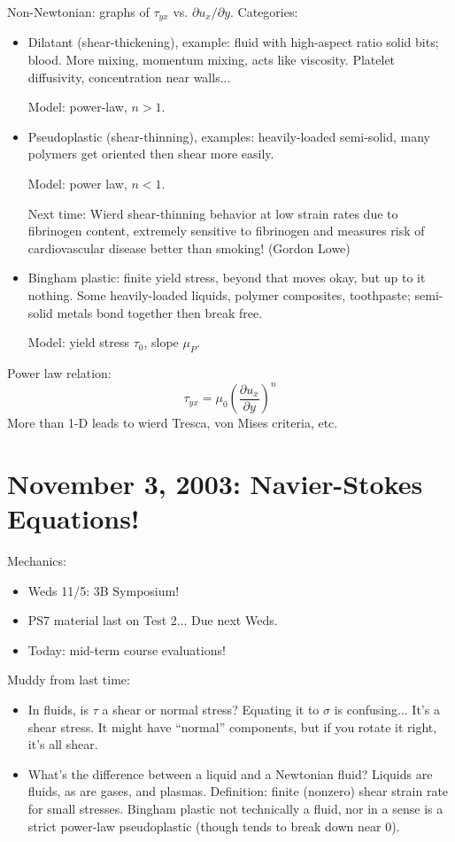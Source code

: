\documentclass{report}
\begin{document}
Non-Newtonian: graphs of $\tau_{yx}$ vs. $\partial u_x/\partial y$.
Categories:
\begin{itemize}
\item Dilatant (shear-thickening), example: fluid with high-aspect ratio solid
  bits; blood.  More mixing, momentum mixing, acts like viscosity.  Platelet
  diffusivity, concentration near walls...

  Model: power-law, $n>1$.

\item Pseudoplastic (shear-thinning), examples: heavily-loaded semi-solid, many
  polymers get oriented then shear more easily.

  Model: power law, $n<1$.

  Next time: Wierd shear-thinning behavior at low strain rates due to
  fibrinogen content, extremely sensitive to fibrinogen and measures risk of
  cardiovascular disease better than smoking!  (Gordon Lowe)

\item Bingham plastic: finite yield stress, beyond that moves okay, but up to
  it nothing.  Some heavily-loaded liquids, polymer composites, toothpaste;
  semi-solid metals bond together then break free.

  Model: yield stress $\tau_0$, slope $\mu_P$.
\end{itemize}
Power law relation:
$$\tau_{yx}=\mu_0\left(\frac{\partial u_x}{\partial y}\right)^n$$
More than 1-D leads to wierd Tresca, von Mises criteria, etc.
\newpage


\section{November 3, 2003: Navier-Stokes Equations!}

Mechanics:
\begin{itemize}
\item Weds 11/5: 3B Symposium!
\item PS7 material last on Test 2...  Due next Weds.
\item Today: mid-term course evaluations!
\end{itemize}

\noindent Muddy from last time:
\begin{itemize}
\item In fluids, is $\tau$ a shear or normal stress?  Equating it to $\sigma$
  is confusing...  It's a shear stress.  It might have ``normal'' components,
  but if you rotate it right, it's all shear.
\item What's the difference between a liquid and a Newtonian fluid?  Liquids
  are fluids, as are gases, and plasmas.  Definition: finite (nonzero) shear
  strain rate for small stresses.  Bingham plastic not technically a fluid, nor
  in a sense is a strict power-law pseudoplastic (though tends to break down
  near 0).
\end{itemize}
\end{document}
